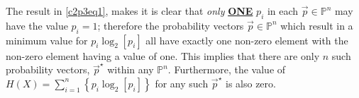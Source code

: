 \documentclass[ClusteringConnectionsMAIN.tex]{subfiles}
\begin{document}
The result in \ref{c2p3eq1}, makes it is clear that \emph{only} \textbf{\underline{ONE}} $p_i$ in each $\vec{p} \in \mathbb{P}^n$ may have the value $p_i = 1$; therefore the probability vectors $\vec{p} \in \mathbb{P}^n$ which result in a minimum value for $p_i \log_2 \left[ p_i \right]$ all have exactly one non-zero element with the non-zero element having a value of one.  This implies that there are only $n$ such probability vectors, $\vec{p}^\star$ within any $\mathbb{P}^n$.  Furthermore, the value of $H(X) = \sum_{i=1}^n \left\{ p_i \log_2 \left[ p_i \right] \right\}$ for any such $\vec{p}^\star$ is also zero.
\end{document}
